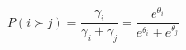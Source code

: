 \begin{equation}
    P(i \succ j) = \frac{\gamma_i}{\gamma_i + \gamma_j} = \frac{e^{\theta_i}}{e^{\theta_i} + e^{\theta_j}}
\end{equation}
